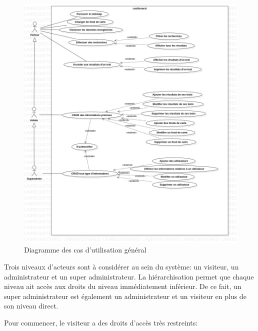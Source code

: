     \paragraph{}
    \begin{figure}
        \centering
        \includegraphics[width=1\textwidth]{images/Analyse_des_besoins/casGeneral.png}
        \caption{Diagramme des cas d'utilisation général}
    \end{figure}
    \par 
    Trois niveaux d'acteurs sont à considérer au sein du système: un visiteur, 
    un administrateur et un super administrateur. La hiérarchisation permet que 
    chaque niveau ait accès aux droits du niveau immédiatement inférieur. 
    De ce fait, un super administrateur est également un administrateur et 
    un visiteur en plus de son niveau direct. \par 
Pour commencer, le visiteur a des droits d'accès très restreints: \par 
